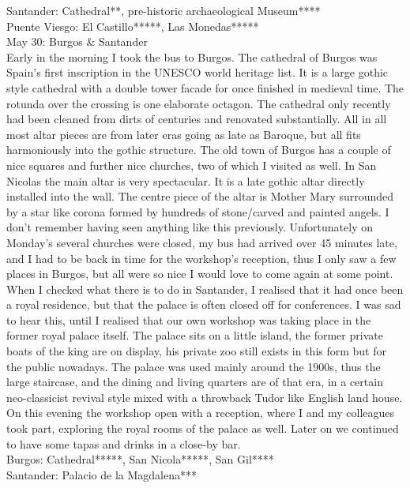 Santander: Cathedral**, pre-historic archaeological Museum****\\
Puente Viesgo: El Castillo*****, Las Monedas*****\\

May 30: Burgos \& Santander\\
Early in the morning I took the bus to Burgos. The cathedral of Burgos was Spain's first inscription in the UNESCO world heritage list. It is a large gothic style cathedral with a double tower facade for once finished in medieval time. The rotunda over the crossing is one elaborate octagon. The cathedral only recently had been cleaned from dirts of centuries and renovated substantially. All in all most altar pieces are from later eras going as late as Baroque, but all fits harmoniously into the gothic structure. The old town of Burgos has a couple of nice squares and further nice churches, two of which I visited as well. In San Nicolas the main altar is very spectacular. It is a late gothic altar directly installed into the wall. The centre piece of the altar is Mother Mary surrounded by a star like corona formed by hundreds of stone/carved and painted angels. I don't remember having seen anything like this previously. Unfortunately on Monday's several churches were closed, my bus had arrived over 45 minutes late, and I had to be back in time for the workshop's reception, thus I only saw a few places in Burgos, but all were so nice I would love to come again at some point.\\
When I checked what there is to do in Santander, I realised that it had once been a royal residence, but that the palace is often closed off for conferences. I was sad to hear this, until I realised that our own workshop was taking place in the former royal palace itself. The palace sits on a little island, the former private boats of the king are on display, his private zoo still exists in this form but for the public nowadays. The palace was used mainly around the 1900s, thus the large staircase, and the dining and living quarters are of that era, in a certain neo-classicist revival style mixed with a throwback Tudor like English land house. On this evening the workshop open with a reception, where I and my colleagues took part, exploring the royal rooms of the palace as well. Later on we continued to have some tapas and drinks in a close-by bar.\\

Burgos: Cathedral*****, San Nicola*****, San Gil****\\
Santander: Palacio de la Magdalena***\\

